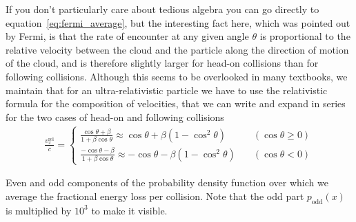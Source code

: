 If you don't particularly care about tedious algebra you can go directly to
equation~\eqref{eq:fermi_average}, but the interesting fact here, which was pointed
out by Fermi, is that the rate of encounter at any given angle $\theta$ is proportional
to the relative velocity between the cloud and the particle along the direction of motion
of the cloud, and is therefore slightly larger for head-on collisions than for following
collisions. Although this seems to be overlooked in many textbooks, we maintain that for an
ultra-relativistic particle we have to use the relativistic formula for the composition
of velocities, that we can write and expand in series for the two cases of head-on
and following collisions
\begin{align*}
  \frac{v_x^\text{rel}}{c} =
  \begin{cases}
  \displaystyle\frac{\cos\theta + \beta }{1 + \beta\cos\theta} \approx
  \cos\theta + \beta (1 - \cos^2\theta)
  & \quad(\cos\theta \geq 0)\\[10pt]
  \displaystyle\frac{-\cos\theta - \beta}{1 + \beta\cos\theta} \approx
  -\cos\theta - \beta (1 - \cos^2\theta)
  & \quad(\cos\theta < 0)
  \end{cases}
\end{align*}

\begin{marginfigure}
  
  \caption{Even and odd components of the probability density function over which
    we average the fractional energy loss per collision. Note that the odd part
    $p_\text{odd}(x)$ is multiplied by $10^3$ to make it visible.}
  \label{fig:fermi_accel_average}
\end{marginfigure}

